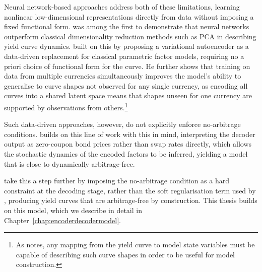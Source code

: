 Neural network-based approaches address both of these limitations, learning nonlinear low-dimensional representations directly from data without imposing a fixed functional form. \citet{Kondratyev2018} was among the first to demonstrate that neural networks outperform classical dimensionality reduction methods such as PCA in describing yield curve dynamics. \citet{Sokol2022} built on this by proposing a variational autoencoder as a data-driven replacement for classical parametric factor models, requiring no a priori choice of functional form for the curve. He further shows that training on data from multiple currencies simultaneously improves the model's ability to generalise to curve shapes not observed for any single currency, as encoding all curves into a shared latent space means that shapes unseen for one currency are supported by observations from others.\footnote{As \citet{Sokol2022} notes, any mapping from the yield curve to model state variables must be capable of describing such curve shapes in order to be useful for model construction.}

Such data-driven approaches, however, do not explicitly enforce no-arbitrage conditions. \citet{Andreasen2023} builds on this line of work with this in mind, interpreting the decoder output as zero-coupon bond prices rather than swap rates directly, which allows the stochastic dynamics of the encoded factors to be inferred, yielding a model that is close to dynamically arbitrage-free.

\citet{MatinWanPoulsen2025} take this a step further by imposing the no-arbitrage condition as a hard constraint at the decoding stage, rather than the soft regularisation term used by \citet{Andreasen2023}, producing yield curves that are arbitrage-free by construction. This thesis builds on this model, which we describe in detail in Chapter~\ref{chap:encoderdecodermodel}.







